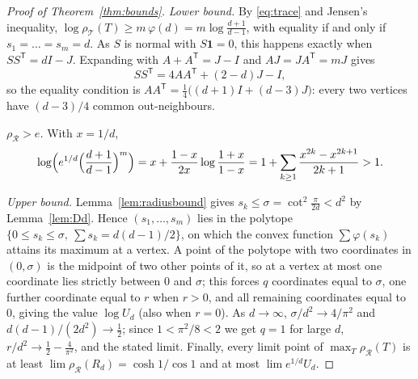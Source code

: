\documentclass[11pt]{amsart}
\theoremstyle{remark}
\numberwithin{equation}{section}
\newcommand{\one}{\mathbf{1}}
\newcommand{\T}{\mathsf{T}}
\newcommand{\cT}{\mathcal{T}}
\newcommand{\cR}{\mathcal{R}}
\begin{document}
\begin{proof}[Proof of Theorem~\ref{thm:bounds}]
\emph{Lower bound.} By \eqref{eq:trace} and Jensen's inequality, $\log\rho_\cT(T)\ge m\,\varphi(d)=m\log\frac{d+1}{d-1}$, with equality if and only if $s_1=\dots=s_m=d$. As $S$ is normal with $S\one=0$, this happens exactly when $SS^\T=dI-J$. Expanding with $A+A^\T=J-I$ and $AJ=JA^\T=mJ$ gives
\[
SS^\T=4AA^\T+(2-d)J-I,
\]
so the equality condition is $AA^\T=\frac14\bigl((d+1)I+(d-3)J\bigr)$: every two vertices have $(d-3)/4$ common out-neighbours.

\emph{$\rho_\cR>e$.} With $x=1/d$,
\[
\log\Bigl(e^{1/d}\Bigl(\frac{d+1}{d-1}\Bigr)^m\Bigr)=x+\frac{1-x}{2x}\log\frac{1+x}{1-x}=1+\sum_{k\ge1}\frac{x^{2k}-x^{2k+1}}{2k+1}>1.
\]

\emph{Upper bound.} Lemma~\ref{lem:radiusbound} gives $s_k\le\sigma=\cot^2\frac\pi{2d}<d^2$ by Lemma~\ref{lem:Dd}. Hence $(s_1,\dots,s_m)$ lies in the polytope $\{0\le s_k\le\sigma,\ \sum s_k=d(d-1)/2\}$, on which the convex function $\sum\varphi(s_k)$ attains its maximum at a vertex. A point of the polytope with two coordinates in $(0,\sigma)$ is the midpoint of two other points of it, so at a vertex at most one coordinate lies strictly between $0$ and $\sigma$; this forces $q$ coordinates equal to $\sigma$, one further coordinate equal to $r$ when $r>0$, and all remaining coordinates equal to $0$, giving the value $\log U_d$ (also when $r=0$). As $d\to\infty$, $\sigma/d^2\to4/\pi^2$ and $d(d-1)/(2d^2)\to\frac12$; since $1<\pi^2/8<2$ we get $q=1$ for large $d$, $r/d^2\to\frac12-\frac4{\pi^2}$, and the stated limit. Finally, every limit point of $\max_T\rho_\cR(T)$ is at least $\lim\rho_\cR(R_d)=\cosh1/\cos1$ and at most $\lim e^{1/d}U_d$.
\end{proof}
\end{document}
